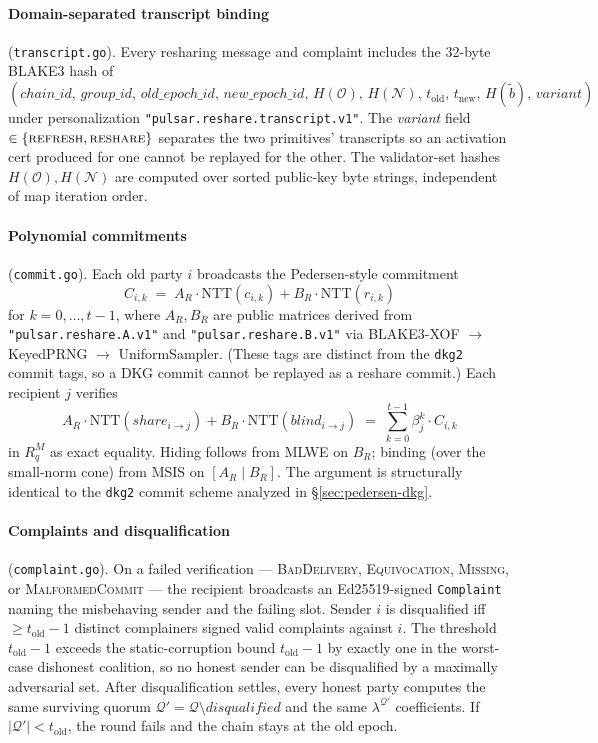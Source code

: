 \paragraph{Domain-separated transcript binding} (\texttt{transcript.go}). Every resharing message and complaint includes the 32-byte BLAKE3 hash of
\[
  (\mathit{chain\_id},\, \mathit{group\_id},\, \mathit{old\_epoch\_id},\, \mathit{new\_epoch\_id},\, H(\mathcal{O}),\, H(\mathcal{N}),\, t_{\mathrm{old}},\, t_{\mathrm{new}},\, H(\tilde b),\, \mathit{variant})
\]
under personalization \texttt{"pulsar.reshare.transcript.v1"}. The \emph{variant} field $\in \{\textsc{refresh}, \textsc{reshare}\}$ separates the two primitives' transcripts so an activation cert produced for one cannot be replayed for the other. The validator-set hashes $H(\mathcal{O}), H(\mathcal{N})$ are computed over sorted public-key byte strings, independent of map iteration order.

\paragraph{Polynomial commitments} (\texttt{commit.go}). Each old party $i$ broadcasts the Pedersen-style commitment
\[
  C_{i,k} \;=\; A_R \cdot \mathrm{NTT}(c_{i,k}) + B_R \cdot \mathrm{NTT}(r_{i,k})
\]
for $k = 0, \dots, t-1$, where $A_R, B_R$ are public matrices derived from \texttt{"pulsar.reshare.A.v1"} and \texttt{"pulsar.reshare.B.v1"} via BLAKE3-XOF $\to$ KeyedPRNG $\to$ UniformSampler. (These tags are distinct from the \texttt{dkg2} commit tags, so a DKG commit cannot be replayed as a reshare commit.) Each recipient $j$ verifies
\[
  A_R \cdot \mathrm{NTT}(\mathit{share}_{i \to j}) + B_R \cdot \mathrm{NTT}(\mathit{blind}_{i \to j}) \;=\; \sum_{k=0}^{t-1} \beta_j^k \cdot C_{i,k}
\]
in $R_q^M$ as exact equality. Hiding follows from MLWE on $B_R$; binding (over the small-norm cone) from MSIS on $[A_R \mid B_R]$. The argument is structurally identical to the \texttt{dkg2} commit scheme analyzed in \S\ref{sec:pedersen-dkg}.

\paragraph{Complaints and disqualification} (\texttt{complaint.go}). On a failed verification --- \textsc{BadDelivery}, \textsc{Equivocation}, \textsc{Missing}, or \textsc{MalformedCommit} --- the recipient broadcasts an Ed25519-signed \texttt{Complaint} naming the misbehaving sender and the failing slot. Sender $i$ is disqualified iff $\geq t_{\mathrm{old}} - 1$ distinct complainers signed valid complaints against $i$. The threshold $t_{\mathrm{old}} - 1$ exceeds the static-corruption bound $t_{\mathrm{old}} - 1$ by exactly one in the worst-case dishonest coalition, so no honest sender can be disqualified by a maximally adversarial set. After disqualification settles, every honest party computes the same surviving quorum $\mathcal{Q}' = \mathcal{Q} \setminus \mathit{disqualified}$ and the same $\lambda^{\mathcal{Q}'}$ coefficients. If $|\mathcal{Q}'| < t_{\mathrm{old}}$, the round fails and the chain stays at the old epoch.


